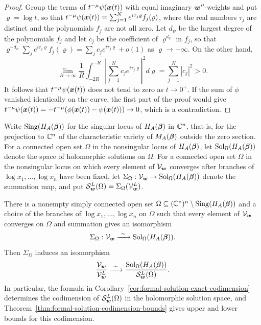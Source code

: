 \begin{proof}
	Group the terms of \(t^{-\mu}\psi(\boldsymbol{x}(t))\) with equal imaginary \(\boldsymbol{w}''\)-weights and put \(\varrho=\log t\), so that \(t^{-\mu}\psi(\boldsymbol{x}(t)) = \sum_{j=1}^{N}e^{i\tau_j\varrho}f_j(\varrho)\), where the real numbers \(\tau_j\) are distinct and the polynomials \(f_j\) are not all zero.
	Let \(d_{\psi}\) be the largest degree of the polynomials \(f_j\) and let \(c_j\) be the coefficient of \(\varrho^{d_{\psi}}\) in \(f_j\), so that \(\varrho^{-d_{\psi}}\sum_je^{i\tau_j\varrho}f_j(\varrho) = \sum_jc_je^{i\tau_j\varrho}+o(1)\) as \(\varrho\to-\infty\).
	On the other hand,
	\[
		\lim_{R\to\infty}
		\frac{1}{R}
		\int_{-2R}^{-R}
		\left|
		\sum_{j=1}^{N}c_je^{i\tau_j\varrho}
		\right|^2d\varrho
		=
		\sum_{j=1}^{N}|c_j|^2
		>
		0.
	\]
	It follows that \(t^{-\mu}\psi(\boldsymbol{x}(t))\) does not tend to zero as \(t\to0^+\).
	If the sum of \(\phi\) vanished identically on the curve, the first part of the proof would give \(t^{-\mu}\psi(\boldsymbol{x}(t))=-t^{-\mu}(\phi(\boldsymbol{x}(t))-\psi(\boldsymbol{x}(t)))\to0\), which is a contradiction.
\end{proof}

Write \(\operatorname{Sing}(H_A(\boldsymbol{\beta}))\) for the singular locus of \(H_A(\boldsymbol{\beta})\) in \(\mathbb C^n\), that is, for the projection to \(\mathbb C^n\) of the characteristic variety of \(M_A(\boldsymbol{\beta})\) outside the zero section.
For a connected open set \(\Omega\) in the nonsingular locus of \(H_A(\boldsymbol{\beta})\), let \(\operatorname{Sol}_{\Omega}(H_A(\boldsymbol{\beta}))\) denote the space of holomorphic solutions on \(\Omega\).
For a connected open set \(\Omega\) in the nonsingular locus on which every element of \(\mathcal V_{\boldsymbol{w}}\) converges after branches of \(\log x_1,\ldots,\log x_n\) have been fixed, let \(\Sigma_{\Omega}:\mathcal V_{\boldsymbol{w}}\to\operatorname{Sol}_{\Omega}(H_A(\boldsymbol{\beta}))\) denote the summation map, and put \(\mathcal S_{\boldsymbol{w}}^{L}(\Omega)=\Sigma_{\Omega}(\mathcal V_{\boldsymbol{w}}^{L})\).

\begin{theorem}
	\label{thm:analytic-realization}
	There is a nonempty simply connected open set \(\Omega \subseteq (\mathbb C^*)^n\setminus\operatorname{Sing}(H_A(\boldsymbol{\beta}))\) and a choice of the branches of \(\log x_1,\ldots,\log x_n\) on \(\Omega\) such that every element of \(\mathcal V_{\boldsymbol{w}}\) converges on \(\Omega\) and summation gives an isomorphism
	\begin{equation}
		\Sigma_{\Omega}:
		\mathcal V_{\boldsymbol{w}}
		\xrightarrow{\ \sim\ }
		\operatorname{Sol}_{\Omega}(H_A(\boldsymbol{\beta})).
		\label{eq:analytic-summation-isomorphism}
	\end{equation}
	Then \(\Sigma_{\Omega}\) induces an isomorphism
	\begin{equation}
		\frac{\mathcal V_{\boldsymbol{w}}}
		{\mathcal V_{\boldsymbol{w}}^{L}}
		\xrightarrow{\ \sim\ }
		\frac{\operatorname{Sol}_{\Omega}(H_A(\boldsymbol{\beta}))}
		{\mathcal S_{\boldsymbol{w}}^{L}(\Omega)}.
		\label{eq:analytic-intrinsic-quotient}
	\end{equation}
	In particular, the formula in Corollary~\ref{cor:formal-solution-exact-codimension} determines the codimension of \(\mathcal S_{\boldsymbol{w}}^{L}(\Omega)\) in the holomorphic solution space, and Theorem~\ref{thm:formal-solution-codimension-bounds} gives upper and lower bounds for this codimension.
\end{theorem}


